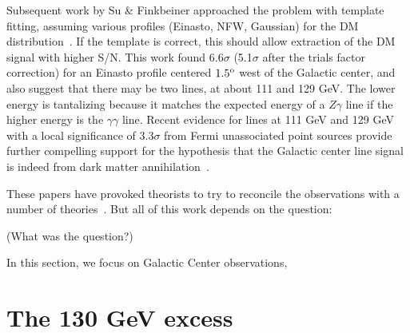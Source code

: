 \documentclass[aps,twocolumn,prd,superscriptaddress,showpacs,nofootinbib,fixfloat]{revtex4}
\newcommand{\degree}{^{\rm o}}
\begin{document}
Subsequent work by Su \& Finkbeiner approached the problem
with template fitting, assuming various profiles (Einasto,
NFW, Gaussian) for the DM distribution~\citep{linepaper}.
If the template is correct, this should allow extraction of
the DM signal with higher S/N.  This work found 6.6$\sigma$
(5.1$\sigma$ after the trials factor correction) for an
Einasto profile centered $1.5\degree$ west of the Galactic
center, and also suggest that there may be two lines, at
about 111 and 129 GeV.  The lower energy is tantalizing
because it matches the expected energy of a $Z\gamma$ line
if the higher energy is the $\gamma\gamma$ line.  Recent
evidence for lines at 111 GeV and 129 GeV with a local
significance of $3.3\sigma$ from Fermi unassociated point
sources provide further compelling support for the
hypothesis that the Galactic center line signal is indeed
from dark matter annihilation~\cite{doubleline}.

These papers have provoked theorists to try to reconcile the
observations with a number of
theories~\citep{Dudas:2012,Choi:2012,Kyae:2012,Lee:2012,Rajaraman:2012,Acharya:2012,Garny:2012,Buckley:2012,Chu:2012,Kang:2012,Buchmuller:2012,Heo:2012,Park:2012,Tulin:2012,Cline:2012,Weiner:2012}.
But all of this work depends on the question:

(What was the question?)



In this section, we focus on Galactic Center observations, 


\section{The 130 GeV excess}
\end{document}

